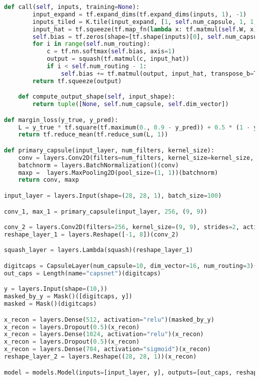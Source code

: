 \begin{lstlisting}[language=Python]
    def call(self, inputs, training=None):
        input_expand = tf.expand_dims(tf.expand_dims(inputs, 1), -1)
        inputs_tiled = K.tile(input_expand, [1, self.num_capsule, 1, 1, 1])
        input_hat = tf.squeeze(tf.map_fn(lambda x: tf.matmul(self.W, x), elems=inputs_tiled))
        self.bias = tf.zeros(shape=[tf.shape(inputs)[0], self.num_capsule, 1, self.input_num_capsule])
        for i in range(self.num_routing):
            c = tf.nn.softmax(self.bias, axis=1)
            output = squash(tf.matmul(c, input_hat))
            if i < self.num_routing - 1:
                self.bias += tf.matmul(output, input_hat, transpose_b=True)
        return tf.squeeze(output)

    def compute_output_shape(self, input_shape):
        return tuple([None, self.num_capsule, self.dim_vector])

def margin_loss(y_true, y_pred):
    L = y_true * tf.square(tf.maximum(0., 0.9 - y_pred)) + 0.5 * (1 - y_true) * tf.square(tf.maximum(0., y_pred - 0.1))
    return tf.reduce_mean(tf.reduce_sum(L, 1))

def primary_capsule(input_layer, num_filters, kernel_size):
    conv = layers.Conv2D(filters=num_filters, kernel_size=kernel_size, activation="relu", padding="valid")(input_layer)
    batchnorm = layers.BatchNormalization()(conv)
    maxp =  layers.MaxPooling2D(pool_size=(1, 1))(batchnorm)
    return conv, maxp

input_layer = layers.Input(shape=(28, 28, 1), batch_size=100)

conv_1, max_1 = primary_capsule(input_layer, 256, (9, 9))

conv_2 = layers.Conv2D(filters=256, kernel_size=(9, 9), strides=2, activation=None, padding="valid")(max_1)
reshape_layer_1 = layers.Reshape([-1, 8])(conv_2)

squash_layer = layers.Lambda(squash)(reshape_layer_1)

digitcaps = CapsuleLayer(num_capsule=10, dim_vector=16, num_routing=3)(squash_layer)
out_caps = Length(name="capsnet")(digitcaps)

y = layers.Input(shape=(10,))
masked_by_y = Mask()([digitcaps, y])
masked = Mask()(digitcaps)

x_recon = layers.Dense(512, activation="relu")(masked_by_y)
x_recon = layers.Dropout(0.5)(x_recon)
x_recon = layers.Dense(1024, activation="relu")(x_recon)
x_recon = layers.Dropout(0.5)(x_recon)
x_recon = layers.Dense(784, activation="sigmoid")(x_recon)
reshape_layer_2 = layers.Reshape((28, 28, 1))(x_recon)

model = models.Model(inputs=[input_layer, y], outputs=[out_caps, reshape_layer_2])
\end{lstlisting}

\newpage